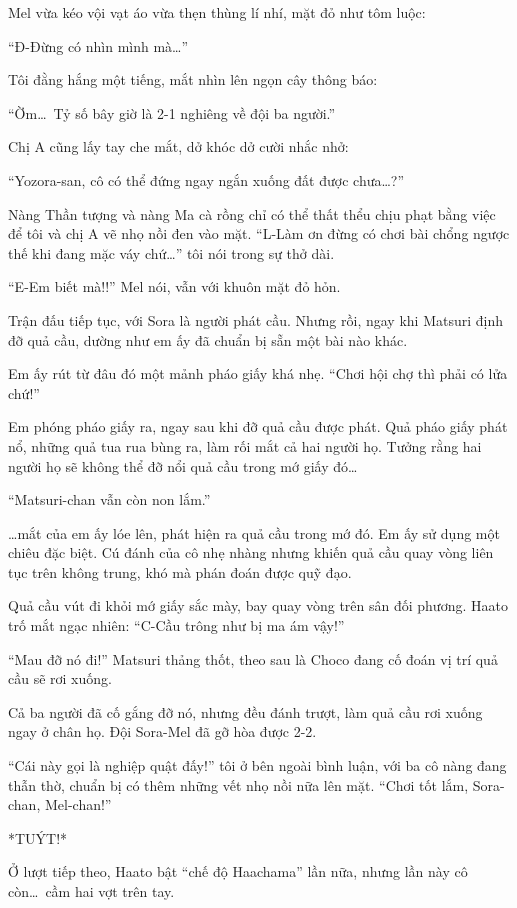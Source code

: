 \documentclass[../main.tex]{subfiles}
\begin{document}
Mel vừa kéo vội vạt áo vừa thẹn thùng lí nhí, mặt đỏ như tôm luộc:

``Đ-Đừng có nhìn mình mà\dots''

Tôi đằng hắng một tiếng, mắt nhìn lên ngọn cây thông báo:

``Ờm\dots\ Tỷ số bây giờ là 2-1 nghiêng về đội ba người.''

Chị A cũng lấy tay che mắt, dở khóc dở cười nhắc nhở:

``Yozora-san, cô có thể đứng ngay ngắn xuống đất được chưa\dots?''

Nàng Thần tượng và nàng Ma cà rồng chỉ có thể thất thểu chịu phạt bằng việc để tôi và chị A vẽ nhọ nồi đen vào mặt. ``L-Làm ơn đừng có chơi bài chổng ngược thế khi đang mặc váy chứ\dots'' tôi nói trong sự thở dài.

``E-Em biết mà!!'' Mel nói, vẫn với khuôn mặt đỏ hỏn.

Trận đấu tiếp tục, với Sora là người phát cầu. Nhưng rồi, ngay khi Matsuri định đỡ quả cầu, dường như em ấy đã chuẩn bị sẵn một bài nào khác.

Em ấy rút từ đâu đó một mảnh pháo giấy khá nhẹ. ``Chơi hội chợ thì phải có lửa chứ!''

Em phóng pháo giấy ra, ngay sau khi đỡ quả cầu được phát. Quả pháo giấy phát nổ, những quả tua rua bùng ra, làm rối mắt cả hai người họ. Tưởng rằng hai người họ sẽ không thể đỡ nổi quả cầu trong mớ giấy đó\dots

``Matsuri-chan vẫn còn non lắm.''

\dots mắt của em ấy lóe lên, phát hiện ra quả cầu trong mớ đó. Em ấy sử dụng một chiêu đặc biệt. Cú đánh của cô nhẹ nhàng nhưng khiến quả cầu quay vòng liên tục trên không trung, khó mà phán đoán được quỹ đạo.

Quả cầu vút đi khỏi mớ giấy sắc mày, bay quay vòng trên sân đối phương. Haato trố mắt ngạc nhiên: ``C-Cầu trông như bị ma ám vậy!''

``Mau đỡ nó đi!'' Matsuri thảng thốt, theo sau là Choco đang cố đoán vị trí quả cầu sẽ rơi xuống.

Cả ba người đã cố gắng đỡ nó, nhưng đều đánh trượt, làm quả cầu rơi xuống ngay ở chân họ. Đội Sora-Mel đã gỡ hòa được 2-2.

``Cái này gọi là nghiệp quật đấy!'' tôi ở bên ngoài bình luận, với ba cô nàng đang thẫn thờ, chuẩn bị có thêm những vết nhọ nồi nữa lên mặt. ``Chơi tốt lắm, Sora-chan, Mel-chan!''

*TUÝT!*

Ở lượt tiếp theo, Haato bật ``chế độ Haachama'' lần nữa, nhưng lần này cô còn\dots\ cầm hai vợt trên tay.
\end{document}
